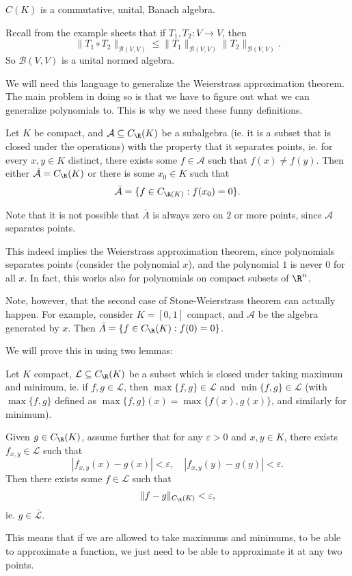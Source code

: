 \documentclass[a4paper]{article}
\begin{document}
\begin{eg}
  $C(K)$ is a commutative, unital, Banach algebra.
\end{eg}

\begin{eg}
  Recall from the example sheets that if $T_1, T_2: V\to V$, then
  \[
    \|T_1 \circ T_2\|_{\mathcal{B}(V, V)} \leq \|T_1\|_{\mathcal{B}(V, V)}\|T_2\|_{\mathcal{B}(V, V)}.
  \]
  So $\mathcal{B}(V, V)$ is a unital normed algebra.
\end{eg}

We will need this language to generalize the Weierstrass approximation theorem. The main problem in doing so is that we have to figure out what we can generalize polynomials to. This is why we need these funny definitions.

\begin{thm}
  Let $K$ be compact, and $\mathcal{A} \subseteq C_{\R}(K)$ be a subalgebra (ie. it is a subset that is closed under the operations) with the property that it separates points, ie. for every $x, y \in K$ distinct, there exists some $f \in \mathcal{A}$ such that $f(x) \not= f(y)$. Then either $\bar{\mathcal{A}} = C_\R(K)$ or there is some $x_0 \in K$ such that
  \[
    \bar{\mathcal{A}} = \{f \in C_{\R(K)}: f(x_0) = 0\}.
  \]
\end{thm}
Note that it is not possible that $\bar{A}$ is always zero on $2$ or more points, since $\mathcal{A}$ separates points.

This indeed implies the Weierstrass approximation theorem, since polynomials separates points (consider the polynomial $x$), and the polynomial $1$ is never $0$ for all $x$. In fact, this works also for polynomials on compact subsets of $\R^n$.

Note, however, that the second case of Stone-Weierstrass theorem can actually happen. For example, consider $K = [0, 1]$ compact, and $\mathcal{A}$ be the algebra generated by $x$. Then $\bar{A} = \{f \in C_\R(K): f(0) = 0\}$.

We will prove this in using two lemmas:
\begin{lemma}
  Let $K$ compact, $\mathcal{L} \subseteq C_\R(K)$ be a subset which is closed under taking maximum and minimum, ie. if $f, g \in \mathcal{L}$, then $\max\{f, g\} \in \mathcal{L}$ and $\min \{f, g\} \in \mathcal{L}$ (with $\max\{f, g\}$ defined as $\max\{f, g\}(x) = \max\{f(x), g(x)\}$, and similarly for minimum).

  Given $g \in C_\R(K)$, assume further that for any $\varepsilon > 0$ and $x, y \in K$, there exists $f_{x, y} \in \mathcal{L}$ such that
  \[
    |f_{x, y}(x) - g(x)| < \varepsilon,\quad |f_{x, y}(y) - g(y)| < \varepsilon.
  \]
  Then there exists some $f \in \mathcal{L}$ such that
  \[
    \|f - g\|_{C_\R(K)} < \varepsilon,
  \]
  ie. $g \in \bar{\mathcal{L}}$.
\end{lemma}
This means that if we are allowed to take maximums and minimums, to be able to approximate a function, we just need to be able to approximate it at any two points.
\end{document}
